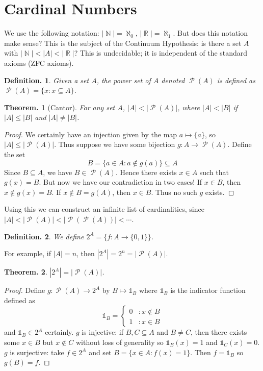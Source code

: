 \documentclass[11pt, a4paper]{memoir}
\DeclareMathOperator{\N}{{\mathbb{N}}}
\DeclareMathOperator{\R}{{\mathbb{R}}}
\theoremstyle{change}
\newtheorem{theorem}{Theorem.}[section]
\theoremstyle{plain}
\theoremstyle{nonumberplain}
\newtheorem{definition}{Definition.}
\newtheorem{proof}{Proof}
\DeclareMathOperator{\Ps}{\mathcal{P}}
\numberwithin{equation}{section}
\begin{document}
\section{Cardinal Numbers}
We use the following notation: $|\N|=\aleph_0$, $|\R|=\aleph_1$. But does this notation make sense? This is the subject of
the Continuum Hypothesis: is there a set $A$ with $|\N|<|A|<|\R|$? This is undecidable; it is independent of the standard
axioms (ZFC axioms).
\begin{definition}
    Given a set $A$, the power set of $A$ denoted $\Ps(A)$ is defined as $\Ps(A)=\{x:x\subseteq A\}$.
\end{definition}
\begin{theorem}[Cantor]
    For any set $A$, $|A|<|\Ps(A)|$, where $|A|<|B|$ if $|A|\leq|B|$ and $|A|\neq|B|$.
\end{theorem}
\begin{proof}
    We certainly have an injection given by the map $a\mapsto\{a\}$, so $|A|\leq|\Ps(A)|$. Thus suppose we have
    some bijection $g:A\to\Ps(A)$. Define the set
    \[B=\{a\in A:a\notin g(a)\}\subseteq A\]
    Since $B\subseteq A$, we have $B\in\Ps(A)$. Hence there exists $x\in A$ such that $g(x)=B$. But now we have our contradiction
    in two cases! If $x\in B$, then $x\notin g(x)=B$. If $x\notin B=g(A)$, then $x\in B$. Thus no such $g$ exists.
\end{proof}
Using this we can construct an infinite list of cardinalities, since $|A|<|\Ps(A)|<|\Ps(\Ps(A))|<\cdots$.
\begin{definition}
    We define $2^A=\{f:A\to\{0,1\}\}$.
\end{definition}
For example, if $|A|=n$, then $|2^A|=2^n=|\Ps(A)|$.
\begin{theorem}
    $|2^A|=|\Ps(A)|$.
\end{theorem}
\begin{proof}
    Define $g:\Ps(A)\to 2^A$ by $B\mapsto \mathds{1}_B$ where $\mathds{1}_B$ is the indicator function defined as
    \[\mathds{1}_B=
    \begin{cases}
        0 &:x\notin B\\
        1 &:x\in B
    \end{cases}
    \]
    and $\mathds{1}_B\in 2^A$ certainly. $g$ is injective: if $B,C\subseteq A$ and $B\neq C$, then there exists
    some $x\in B$ but $x\notin C$ without loss of generality so $\mathds{1}_B(x)=1$ and $\mathds{1}_C(x)=0$. $g$
    is surjective: take $f\in 2^A$ and set $B=\{x\in A:f(x)=1\}$. Then $f=\mathds{1}_B$ so $g(B)=f$.
\end{proof}
\end{document}
